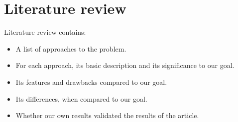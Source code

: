 \section{Literature review}
Literature review contains:
\begin{itemize}
	\item A list of approaches to the problem.
	\item For each approach, its basic description and its significance to our goal.
	\item Its features and drawbacks compared to our goal.
	\item Its differences, when compared to our goal.
	\item Whether our own results validated the results of the article.
\end{itemize}





